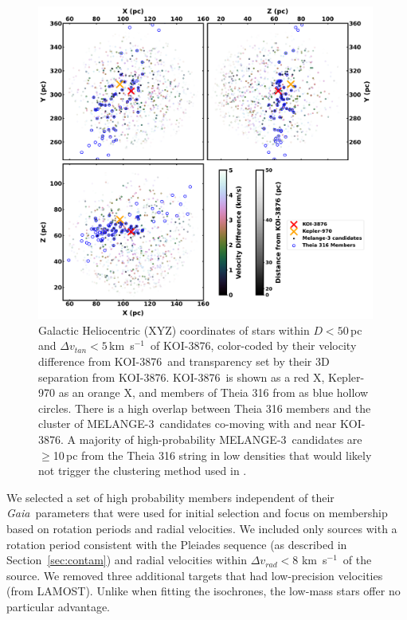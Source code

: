 \documentclass[twocolumn, linenumbers]{aastex631}
\newcommand{\association}{MELANGE-3}
\newcommand{\starname}{KOI-3876}
\newcommand\kms{km~s$^{-1}$}
\newcommand{\gaia}{\textit{Gaia}}
\begin{document}
\begin{figure}[p]
    \centering
    \includegraphics[width=0.99\textwidth]{xyz.pdf}
    \caption{Galactic Heliocentric (XYZ) coordinates of stars within $D < 50$\,pc and $\Delta v_{tan} < 5$\,\kms\ of \starname, color-coded by their velocity difference from \starname\ and transparency set by their 3D separation from \starname. \starname\ is shown as a red X, Kepler-970 as an orange X, and members of Theia 316 from \citet{2019AJ....158..122K} as blue hollow circles. There is a high overlap between Theia 316 members and the cluster of \association\ candidates co-moving with and near \starname. A majority of high-probability \association\ candidates are $\geq$10\,pc from the Theia 316 string in low densities that would likely not trigger the clustering method used in \citet{2019AJ....158..122K}.  }
    \label{fig:xyz}
\end{figure}

We selected a set of high probability members independent of their \gaia\ parameters that were used for initial selection and focus on membership based on rotation periods and radial velocities. We included only sources with a rotation period consistent with the Pleiades sequence (as described in Section~\ref{sec:contam}) and radial velocities within $\Delta v_{rad} < 8$ \kms\ of the source. We removed three additional targets that had low-precision velocities (from LAMOST). Unlike when fitting the isochrones, the low-mass stars offer no particular advantage. 
\end{document}
